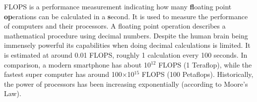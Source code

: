 
FLOPS is a performance measurement indicating how many \textbf{fl}oating point \textbf{op}erations can be calculated in a \textbf{s}econd. It is used to measure the performance of computers and their processors. A floating point operation describes a mathematical procedure using decimal numbers. Despite the human brain being immensely powerful its capabilities when doing decimal calculations is limited. It is estimated at around 0.01 FLOPS, roughly 1 calculation every 100 seconds. In comparison, a modern smartphone has about 10$^{12}$ FLOPS (1 Teraflop), while the fastest super computer has around 100$\times$10$^{15}$ FLOPS (100 Petaflops). Historically, the power of processors has been increasing exponentially (according to Moore's Law).


